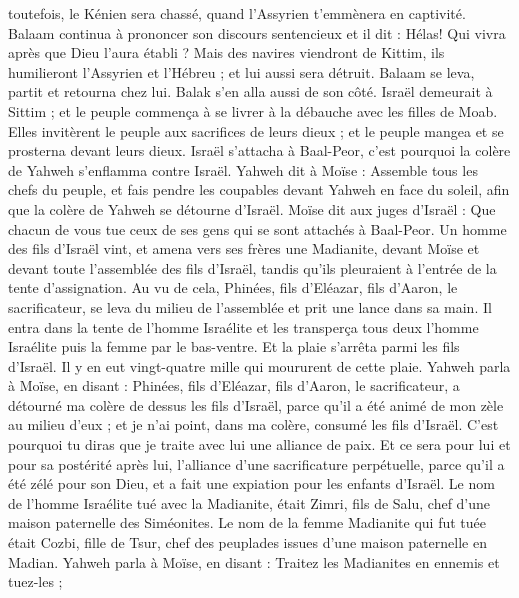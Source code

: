\begin{multicols}{2}
toutefois, le Kénien sera chassé, quand l’Assyrien t’emmènera en captivité.
Balaam continua à prononcer son discours sentencieux et il dit : Hélas! Qui vivra après que Dieu l’aura établi ?
Mais des navires viendront de Kittim, ils humilieront l’Assyrien et l’Hébreu ; et lui aussi sera détruit.
Balaam se leva, partit et retourna chez lui. Balak s'en alla aussi de son côté.
\VerseOne{}Israël demeurait à Sittim ; et le peuple commença à se livrer à la débauche avec les filles de Moab.
Elles invitèrent le peuple aux sacrifices de leurs dieux ; et le peuple mangea et se prosterna devant leurs dieux.
Israël s'attacha à Baal-Peor, c'est pourquoi la colère de Yahweh s'enflamma contre Israël.
Yahweh dit à Moïse : Assemble tous les chefs du peuple, et fais pendre les coupables devant Yahweh en face du soleil, afin que la colère de Yahweh se détourne d'Israël.
Moïse dit aux juges d'Israël : Que chacun de vous tue ceux de ses gens qui se sont attachés à Baal-Peor.
Un homme des fils d'Israël vint, et amena vers ses frères une Madianite, devant Moïse et devant toute l'assemblée des fils d'Israël, tandis qu’ils pleuraient à l’entrée de la tente d'assignation.
Au vu de cela, Phinées, fils d'Eléazar, fils d'Aaron, le sacrificateur, se leva du milieu de l'assemblée et prit une lance dans sa main.
Il entra dans la tente de l'homme Israélite et les transperça tous deux l'homme Israélite puis la femme par le bas-ventre. Et la plaie s’arrêta parmi les fils d'Israël.
Il y en eut vingt-quatre mille qui moururent de cette plaie.
Yahweh parla à Moïse, en disant :
Phinées, fils d'Eléazar, fils d'Aaron, le sacrificateur, a détourné ma colère de dessus les fils d'Israël, parce qu'il a été animé de mon zèle au milieu d'eux ; et je n'ai point, dans ma colère, consumé les fils d'Israël.
C'est pourquoi tu diras que je traite avec lui une alliance de paix.
Et ce sera pour lui et pour sa postérité après lui, l’alliance d’une sacrificature perpétuelle, parce qu’il a été zélé pour son Dieu, et a fait une expiation pour les enfants d’Israël.
Le nom de l'homme Israélite tué avec la Madianite, était Zimri, fils de Salu, chef d'une maison paternelle des Siméonites.
Le nom de la femme Madianite qui fut tuée était Cozbi, fille de Tsur, chef des peuplades issues d’une maison paternelle en Madian.
Yahweh parla à Moïse, en disant :
Traitez les Madianites en ennemis et tuez-les ;

\end{multicols}
